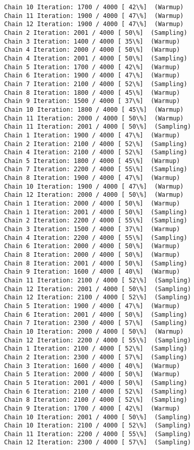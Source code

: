 \documentclass[11pt]{article}
\begin{document}
\begin{Verbatim}[commandchars=\\\{\}]
Chain 10 Iteration: 1700 / 4000 [ 42\%]  (Warmup)
Chain 11 Iteration: 1900 / 4000 [ 47\%]  (Warmup)
Chain 12 Iteration: 1900 / 4000 [ 47\%]  (Warmup)
Chain 2 Iteration: 2001 / 4000 [ 50\%]  (Sampling)
Chain 3 Iteration: 1400 / 4000 [ 35\%]  (Warmup)
Chain 4 Iteration: 2000 / 4000 [ 50\%]  (Warmup)
Chain 4 Iteration: 2001 / 4000 [ 50\%]  (Sampling)
Chain 5 Iteration: 1700 / 4000 [ 42\%]  (Warmup)
Chain 6 Iteration: 1900 / 4000 [ 47\%]  (Warmup)
Chain 7 Iteration: 2100 / 4000 [ 52\%]  (Sampling)
Chain 8 Iteration: 1800 / 4000 [ 45\%]  (Warmup)
Chain 9 Iteration: 1500 / 4000 [ 37\%]  (Warmup)
Chain 10 Iteration: 1800 / 4000 [ 45\%]  (Warmup)
Chain 11 Iteration: 2000 / 4000 [ 50\%]  (Warmup)
Chain 11 Iteration: 2001 / 4000 [ 50\%]  (Sampling)
Chain 1 Iteration: 1900 / 4000 [ 47\%]  (Warmup)
Chain 2 Iteration: 2100 / 4000 [ 52\%]  (Sampling)
Chain 4 Iteration: 2100 / 4000 [ 52\%]  (Sampling)
Chain 5 Iteration: 1800 / 4000 [ 45\%]  (Warmup)
Chain 7 Iteration: 2200 / 4000 [ 55\%]  (Sampling)
Chain 8 Iteration: 1900 / 4000 [ 47\%]  (Warmup)
Chain 10 Iteration: 1900 / 4000 [ 47\%]  (Warmup)
Chain 12 Iteration: 2000 / 4000 [ 50\%]  (Warmup)
Chain 1 Iteration: 2000 / 4000 [ 50\%]  (Warmup)
Chain 1 Iteration: 2001 / 4000 [ 50\%]  (Sampling)
Chain 2 Iteration: 2200 / 4000 [ 55\%]  (Sampling)
Chain 3 Iteration: 1500 / 4000 [ 37\%]  (Warmup)
Chain 4 Iteration: 2200 / 4000 [ 55\%]  (Sampling)
Chain 6 Iteration: 2000 / 4000 [ 50\%]  (Warmup)
Chain 8 Iteration: 2000 / 4000 [ 50\%]  (Warmup)
Chain 8 Iteration: 2001 / 4000 [ 50\%]  (Sampling)
Chain 9 Iteration: 1600 / 4000 [ 40\%]  (Warmup)
Chain 11 Iteration: 2100 / 4000 [ 52\%]  (Sampling)
Chain 12 Iteration: 2001 / 4000 [ 50\%]  (Sampling)
Chain 12 Iteration: 2100 / 4000 [ 52\%]  (Sampling)
Chain 5 Iteration: 1900 / 4000 [ 47\%]  (Warmup)
Chain 6 Iteration: 2001 / 4000 [ 50\%]  (Sampling)
Chain 7 Iteration: 2300 / 4000 [ 57\%]  (Sampling)
Chain 10 Iteration: 2000 / 4000 [ 50\%]  (Warmup)
Chain 12 Iteration: 2200 / 4000 [ 55\%]  (Sampling)
Chain 1 Iteration: 2100 / 4000 [ 52\%]  (Sampling)
Chain 2 Iteration: 2300 / 4000 [ 57\%]  (Sampling)
Chain 3 Iteration: 1600 / 4000 [ 40\%]  (Warmup)
Chain 5 Iteration: 2000 / 4000 [ 50\%]  (Warmup)
Chain 5 Iteration: 2001 / 4000 [ 50\%]  (Sampling)
Chain 6 Iteration: 2100 / 4000 [ 52\%]  (Sampling)
Chain 8 Iteration: 2100 / 4000 [ 52\%]  (Sampling)
Chain 9 Iteration: 1700 / 4000 [ 42\%]  (Warmup)
Chain 10 Iteration: 2001 / 4000 [ 50\%]  (Sampling)
Chain 10 Iteration: 2100 / 4000 [ 52\%]  (Sampling)
Chain 11 Iteration: 2200 / 4000 [ 55\%]  (Sampling)
Chain 12 Iteration: 2300 / 4000 [ 57\%]  (Sampling)

\end{Verbatim}
\end{document}
